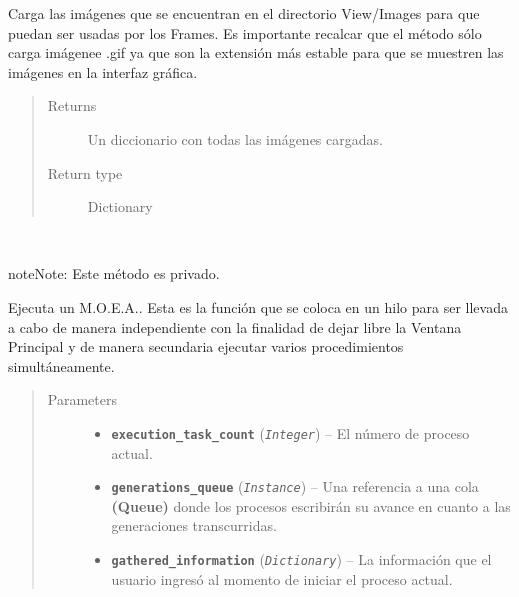 \documentclass[letterpaper,10pt,english]{sphinxmanual}
\begin{document}
\begin{fulllineitems}
\begin{fulllineitems}
Carga las imágenes que se encuentran en el 
directorio View/Images para que puedan ser
usadas por los Frames. Es importante recalcar que el método
sólo carga imágenee .gif ya que son la extensión más estable
para que se muestren las imágenes en la interfaz gráfica.
\begin{quote}\begin{description}
\item[{Returns}] \leavevmode
Un diccionario con todas las imágenes cargadas.

\item[{Return type}] \leavevmode
Dictionary

\end{description}\end{quote}

\end{fulllineitems}


\begin{fulllineitems}
\label{View/MainWindow:View.MainWindow.MainWindow._MainWindow__obtain_results}~
\begin{notice}{note}{Note:}
Este método es privado.
\end{notice}

Ejecuta un M.O.E.A.. Esta es la función que se coloca en un hilo
para ser llevada a cabo de manera independiente con la finalidad 
de dejar libre la Ventana Principal y de manera secundaria ejecutar
varios procedimientos simultáneamente.
\begin{quote}\begin{description}
\item[{Parameters}] \leavevmode\begin{itemize}
\item {} 
\textbf{\texttt{execution\_task\_count}} (\emph{\texttt{Integer}}) -- El número de proceso actual.

\item {} 
\textbf{\texttt{generations\_queue}} (\emph{\texttt{Instance}}) -- Una referencia a una cola \textbf{(Queue)} donde los procesos escribirán su avance
en cuanto a las generaciones transcurridas.

\item {} 
\textbf{\texttt{gathered\_information}} (\emph{\texttt{Dictionary}}) -- La información que el usuario ingresó al momento de iniciar el proceso actual.


\end{itemize}
\end{description}
\end{quote}
\end{fulllineitems}
\end{fulllineitems}
\end{document}
